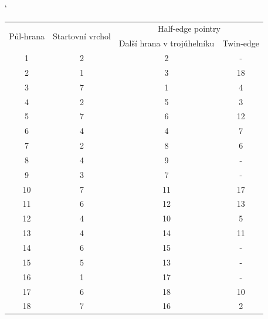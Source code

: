 \documentclass[12pt,a4paper]{article}
\begin{document}
\newpage
\begin{table}[h]
\catcode`
\begin{tabular}{|c||c||c|c|}
\hline
\multirow{2}{*}{Půl-hrana} & \multirow{2}{*}{Startovní vrchol} & \multicolumn{2}{c|}{Half-edge pointry} \\ \cline{3-4} 
                           &                                   & Další hrana v trojúhelníku & Twin-edge \\ \hline
1                          & 2                                 & 2                          & -         \\ \hline
2                          & 1                                 & 3                          & 18        \\ \hline
3                          & 7                                 & 1                          & 4         \\ \hline
4                          & 2                                 & 5                          & 3         \\ \hline
5                          & 7                                 & 6                          & 12        \\ \hline
6                          & 4                                 & 4                          & 7         \\ \hline
7                          & 2                                 & 8                          & 6         \\ \hline
8                          & 4                                 & 9                          & -         \\ \hline
9                          & 3                                 & 7                          & -         \\ \hline
10                         & 7                                 & 11                         & 17        \\ \hline
11                         & 6                                 & 12                         & 13        \\ \hline
12                         & 4                                 & 10                         & 5         \\ \hline
13                         & 4                                 & 14                         & 11        \\ \hline
14                         & 6                                 & 15                         & -         \\ \hline
15                         & 5                                 & 13                         & -         \\ \hline
16                         & 1                                 & 17                         & -         \\ \hline
17                         & 6                                 & 18                         & 10        \\ \hline
18                         & 7                                 & 16                         & 2         \\ \hline
\end{tabular}
\end{table}
\end{document}
